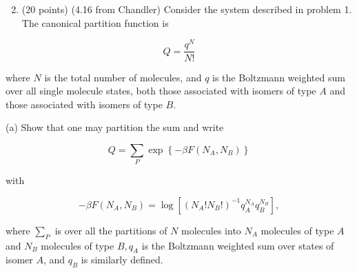 \documentclass[12pt]{article}
\begin{document}
\section{}
\begin{enumerate}
  \setcounter{enumi}{1}
  \item (20 points) (4.16 from Chandler) Consider the system described in problem 1. The canonical partition function is
\end{enumerate}


\begin{equation*}
Q=\frac{q^{N}}{N !} \tag{2}
\end{equation*}


where $N$ is the total number of molecules, and $q$ is the Boltzmann weighted sum over all single molecule states, both those associated with isomers of type $A$ and those associated with isomers of type $B$.

(a) Show that one may partition the sum and write


\begin{equation*}
Q=\sum_{P} \exp \left\{-\beta F\left(N_{A}, N_{B}\right)\right\} \tag{3}
\end{equation*}


with


\begin{equation*}
-\beta F\left(N_{A}, N_{B}\right)=\log \left[\left(N_{A} ! N_{B} !\right)^{-1} q_{A}^{N_{A}} q_{B}^{N_{B}}\right], \tag{4}
\end{equation*}


where $\sum_{P}$ is over all the partitions of $N$ molecules into $N_{A}$ molecules of type $A$ and $N_{B}$ molecules of type $B, q_{A}$ is the Boltzmann weighted sum over states of isomer $A$, and $q_{B}$ is similarly defined.
\end{document}
